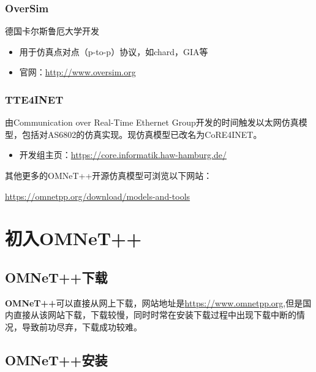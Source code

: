 \subsection{OverSim}
\label{oversim}

德国卡尔斯鲁厄大学开发

\begin{itemize}
\item 用于仿真点对点（p-to-p）协议，如chard，GIA等

\item 官网：\href{http://www.oversim.org}{http:\slash \slash www.oversim.org}

\end{itemize}

\subsection{TTE4INET}
\label{tte4inet}

由Communication over Real-Time Ethernet Group开发的时间触发以太网仿真模型，包括对AS6802的仿真实现。现仿真模型已改名为CoRE4INET。

\begin{itemize}
\item 开发组主页：\href{https://core.informatik.haw-hamburg.de/}{https:\slash \slash core.informatik.haw-hamburg.de\slash }

\end{itemize}

其他更多的OMNeT++开源仿真模型可浏览以下网站：

\href{https://omnetpp.org/download/models-and-tools}{https:\slash \slash omnetpp.org\slash download\slash models-and-tools}

\chapter{初入OMNeT++}
\label{初入omnet}

\section{OMNeT++下载}
\label{omnet下载}

\textbf{OMNeT++}可以直接从网上下载，网站地址是\href{https://www.omnetpp.org}{https:\slash \slash www.omnetpp.org},但是国内直接从该网站下载，下载较慢，同时时常在安装下载过程中出现下载中断的情况，导致前功尽弃，下载成功较难。

\section{OMNeT++安装}
\label{omnet安装}

